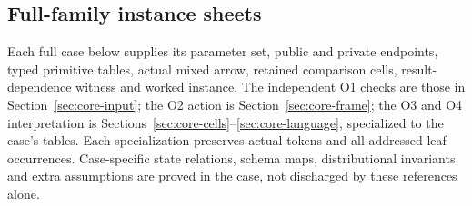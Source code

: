 \documentclass[11pt,a4paper]{article}
\theoremstyle{definition}
\begin{document}
\subsection{Full-family instance sheets}\label{sec:instance-sheet}
Each full case below supplies its parameter set, public and private
endpoints, typed primitive tables, actual mixed arrow, retained comparison
cells, result-dependence witness and worked instance. The independent O1
checks are those in Section~\ref{sec:core-input}; the O2 action is
Section~\ref{sec:core-frame}; the O3 and O4 interpretation is
Sections~\ref{sec:core-cells}--\ref{sec:core-language}, specialized to the
case's tables. Each specialization preserves actual tokens and all
addressed leaf occurrences. Case-specific state relations, schema maps,
distributional invariants and extra assumptions are proved in the case,
not discharged by these references alone.
\end{document}
